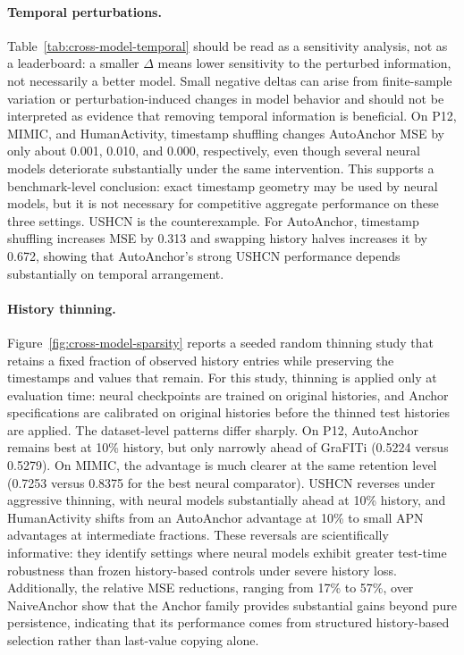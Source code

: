 \documentclass{article}
\newcommand{\method}{AutoAnchor}
\begin{document}
\paragraph{Temporal perturbations.}
Table~\ref{tab:cross-model-temporal} should be read as a sensitivity analysis,
not as a leaderboard: a smaller $\Delta$ means lower sensitivity to the
perturbed information, not necessarily a better model. Small negative deltas can
arise from finite-sample variation or perturbation-induced changes in model
behavior and should not be interpreted as evidence that removing temporal
information is beneficial. On P12, MIMIC, and HumanActivity, timestamp
shuffling changes \method{} MSE by only about 0.001,
0.010, and 0.000, respectively, even though several neural models deteriorate
substantially under the same intervention. This supports a benchmark-level
conclusion: exact timestamp geometry may be used by neural models, but it is not
necessary for competitive aggregate performance on these three settings. USHCN
is the counterexample. For \method{}, timestamp shuffling increases MSE by
0.313 and swapping history halves increases it by 0.672, showing that
\method{}'s strong USHCN performance depends substantially on temporal
arrangement.

\paragraph{History thinning.}
Figure~\ref{fig:cross-model-sparsity} reports a seeded random thinning study that retains a fixed fraction of
observed history entries while preserving the timestamps and values that remain.
For this study, thinning is applied only at evaluation time: neural checkpoints
are trained on original histories, and Anchor specifications are calibrated on
original histories before the thinned test histories are applied.
The dataset-level patterns differ sharply. On P12, \method{} remains best at
10\% history, but only narrowly ahead of GraFITi (0.5224 versus 0.5279). On
MIMIC, the advantage is much clearer at the same retention level (0.7253 versus
0.8375 for the best neural comparator). USHCN reverses under aggressive
thinning, with neural models substantially ahead at 10\% history, and
HumanActivity shifts from an AutoAnchor advantage at 10\% to small APN
advantages at intermediate fractions. These reversals are scientifically
informative: they identify settings where neural models exhibit greater
test-time robustness than frozen history-based controls under severe history
loss. Additionally, the relative MSE reductions, ranging from 17\% to 57\%, over NaiveAnchor show that the Anchor family provides substantial gains beyond pure persistence, indicating that its performance comes from structured history-based selection rather than last-value copying alone.
\end{document}
